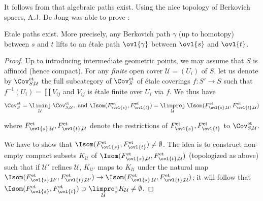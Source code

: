 \begin{para}\label{para::1.3.2} It follows from \cite[exp. V]{sga1} that
 algebraic paths exist. Using the nice topology of Berkovich spaces,
 A.J. De Jong was able to prove \cite[2.9]{efgonas}: 
\end{para}

\begin{klem}\label{lem::1.3.3}  Etale paths exist. More precisely,
 any Berkovich path $\gamma$ (up to homotopy) between $s$ and 
 $t$ lifts to an \'etale path $\ovl{\gamma}$ between $\ovl{s}$ and $\ovl{t}$.
\end{klem}

\begin{proof}
 Up to introducing intermediate geometric points, we may assume
 that $S$ is affinoid (hence compact). For any {\it finite} open cover
 $\mathcal{U}=(U_i)$ of $S$, let us denote by
 $\Cov^{\mathrm{et}}_{S,\mathcal{U}}$ the full subcategory of
 $\Cov^{\mathrm{et}}_{S}$ of \'etale coverings $f:S'\to S$ such that
 $f^{-1}(U_i)= \coprod V_{ij}$ and $V_{ij}$ is \'etale finite over $U_i$
 via $f$.  We thus have
 \begin{equation*}
 \Cov^{\mathrm{et}}_{S}=\underset{\mathcal{U}}{\liminj}\;
  \Cov^{\mathrm{et}}_{S,\mathcal{U}}, \text{ and }
  \Isom(F^{\mathrm{et}}_{\ovl{s}}, F^{\mathrm{et}}_{\ovl{t}})
  =\underset{\mathcal{U}}{\limproj}\;
  \Isom(F^{\mathrm{et}}_{\ovl{s},\mathcal{U}},
  F^{\mathrm{et}}_{\ovl{t},\mathcal{U}})
 \end{equation*}

 \medskip\noindent where $F^{\mathrm{et}}_{\ovl{s},\mathcal{U}},
 F^{\mathrm{et}}_{\ovl{t},\mathcal{U}}$ denote the restrictions of
 $F^{\mathrm{et}}_{\ovl{s} }, F^{\mathrm{et}}_{\ovl{t} }$ to
 $\Cov^{\mathrm{et}}_{S,\mathcal{U}}$.

 We have to show that $\Isom(F^{\mathrm{et}}_{\ovl{s}},
 F^{\mathrm{et}}_{\ovl{t}}) \neq \emptyset$. The idea is to construct 
 non-empty compact subsets $K_\mathcal{U}$ of
 $\Isom(F^{\mathrm{et}}_{\ovl{s},\mathcal{U}},
 F^{\mathrm{et}}_{\ovl{t},\mathcal{U}})$ (topologized as above) such that
 if $\mathcal{U}'$ refines $\mathcal{U}$, $K_{\mathcal{U}'}$ maps to
 $K_\mathcal{U} $ under the natural map
 $\Isom(F^{\mathrm{et}}_{\ovl{s},\mathcal{U}'},
 F^{\mathrm{et}}_{\ovl{t},\mathcal{U}'})\to
 \Isom(F^{\mathrm{et}}_{\ovl{s},\mathcal{U}},
 F^{\mathrm{et}}_{\ovl{t},\mathcal{U}})$; it will follow that
 $\Isom(F^{\mathrm{et}}_{\ovl{s}}, F^{\mathrm{et}}_{\ovl{t}}) \supset
 \underset{\mathcal{U}}{\limproj} K_\mathcal{U}\neq \emptyset$.


\end{proof}
